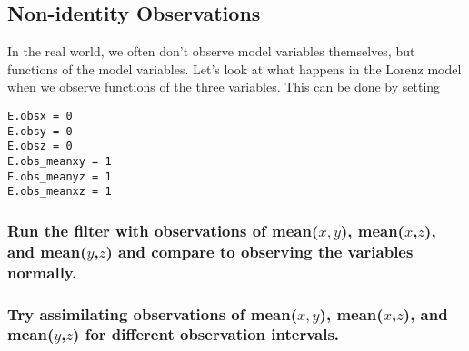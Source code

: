 \subsection{Non-identity Observations}

In the real world, we often don't observe model variables themselves, but functions of the model variables.  
Let's look at what happens in the Lorenz model when we observe  functions of the three variables.  
This can be done by 
setting 
\begin{verbatim}
E.obsx = 0
E.obsy = 0
E.obsz = 0
E.obs_meanxy = 1
E.obs_meanyz = 1
E.obs_meanxz = 1
\end{verbatim}

\subsubsection{Run the filter with observations of mean($x,y$), mean($x$,$z$), and mean($y$,$z$) and compare to observing the variables normally.}
\subsubsection{Try assimilating observations of mean($x,y$), mean($x$,$z$), and mean($y$,$z$) for different observation intervals.}
%

